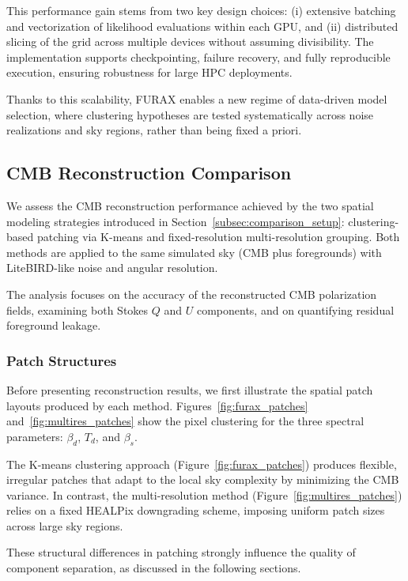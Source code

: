 \documentclass[%
 reprint,
bibnotes,
 amsmath,amssymb,
 aps,
floatfix, 
]{revtex4-2}
\begin{document}
This performance gain stems from two key design choices: (i) extensive batching and vectorization of likelihood evaluations within each GPU, and (ii) distributed slicing of the grid across multiple devices without assuming divisibility. The implementation supports checkpointing, failure recovery, and fully reproducible execution, ensuring robustness for large HPC deployments.

Thanks to this scalability, \textsc{FURAX} enables a new regime of data-driven model selection, where clustering hypotheses are tested systematically across noise realizations and sky regions, rather than being fixed a priori.

\subsection{CMB Reconstruction Comparison}
\label{subsec:cmb_reconstruction}

We assess the CMB reconstruction performance achieved by the two spatial modeling strategies introduced in Section~\ref{subsec:comparison_setup}: clustering-based patching via K-means and fixed-resolution multi-resolution grouping. Both methods are applied to the same simulated sky (CMB plus foregrounds) with LiteBIRD-like noise and angular resolution.

The analysis focuses on the accuracy of the reconstructed CMB polarization fields, examining both Stokes \( Q \) and \( U \) components, and on quantifying residual foreground leakage.

\subsubsection*{Patch Structures}

Before presenting reconstruction results, we first illustrate the spatial patch layouts produced by each method. Figures~\ref{fig:furax_patches} and~\ref{fig:multires_patches} show the pixel clustering for the three spectral parameters: \( \beta_d \), \( T_d \), and \( \beta_s \).

The K-means clustering approach (Figure~\ref{fig:furax_patches}) produces flexible, irregular patches that adapt to the local sky complexity by minimizing the CMB variance. In contrast, the multi-resolution method (Figure~\ref{fig:multires_patches}) relies on a fixed HEALPix downgrading scheme, imposing uniform patch sizes across large sky regions.

These structural differences in patching strongly influence the quality of component separation, as discussed in the following sections.
\end{document}
